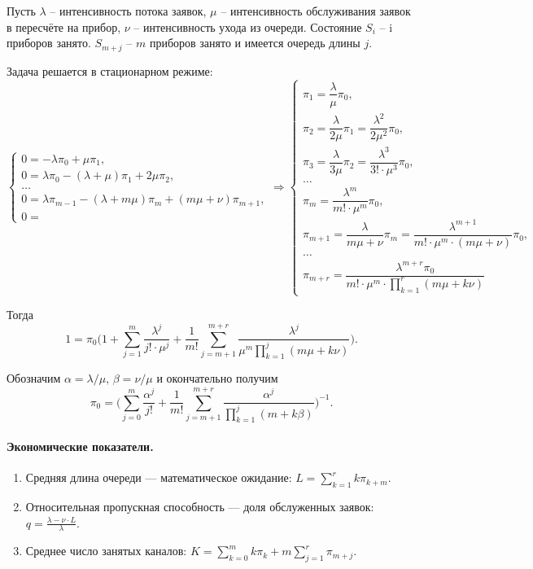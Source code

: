 Пусть $\lambda$ -- интенсивность потока заявок, $\mu$ -- интенсивность обслуживания
заявок в пересчёте на прибор, $\nu$ -- интенсивность ухода из очереди.
Состояние $S_i$ -- i приборов занято. $S_{m+j}$ -- $m$ приборов занято и имеется
очередь длины $j$.

Задача решается в стационарном режиме:
\[
  \begin{cases}
    0 = -\lambda \pi_0 + \mu \pi_1, \\
    0 = \lambda \pi_0 - (\lambda+\mu) \pi_1 + 2\mu\pi_2, \\
    \dots \\
    0 = \lambda \pi_{m-1} - (\lambda+m\mu) \pi_m + (m\mu+\nu) \pi_{m+1}, \\
    0 = 
  \end{cases}
  \Rightarrow
  \begin{cases}
    \pi_1 = \dfrac{\lambda}{\mu} \pi_0, \\
    \pi_2 = \dfrac{\lambda}{2\mu}\pi_1 = \dfrac{\lambda^2}{2\mu^2} \pi_0,\\
    \pi_3 = \dfrac{\lambda}{3\mu} \pi_2 = \dfrac{\lambda^3}{3! \cdot \mu^3} \pi_0, \\
    \dots \\
    \pi_m = \dfrac{\lambda^m}{m! \cdot \mu^m} \pi_0, \\
    \pi_{m+1} = \dfrac{\lambda}{m\mu + \nu} \pi_m = \dfrac{\lambda^{m+1}}{m! \cdot \mu^m \cdot (m\mu+\nu)} \pi_0, \\
    \dots\\
    \pi_{m+r} = \dfrac{\lambda^{m+r} \pi_0}{m! \cdot \mu^m \cdot \prod_{k=1}^r (m\mu+k\nu)}
  \end{cases}
\]

Тогда
\[
1 = \pi_0 \biggl( 1
  + \sum_{j=1}^m \dfrac{\lambda^j}{j! \cdot \mu^j}
+ \dfrac{1}{m!} \sum_{j=m+1}^{m+r} \dfrac{\lambda^j}{\mu^m \prod_{k=1}^j (m\mu +
k\nu)} \biggr).
\]

Обозначим $\alpha = \lambda/\mu, \, \beta = \nu/\mu$ и окончательно получим
\[
  \pi_0 = \biggl( \sum_{j=0}^m \dfrac{\alpha^j}{j!}
  + \dfrac{1}{m!} \sum_{j=m+1}^{m+r} \dfrac{\alpha^j}{\prod_{k=1}^j (m+k\beta)}
  \biggr)^{-1}.
\]

\paragraph{Экономические показатели.}
\begin{enumerate}
  \item Средняя длина очереди --- математическое ожидание:
    $L = \sum\limits_{k=1}^r k \pi_{k+m}$.

  \item Относительная пропускная способность --- доля обслуженных заявок:
    $q = \frac{\lambda - \nu\cdot L}{\lambda}$.

  \item Среднее число занятых каналов:
    $K = \sum\limits_{k=0}^m k \pi_k + m \sum\limits_{j=1}^r \pi_{m+j}$.
\end{enumerate}

